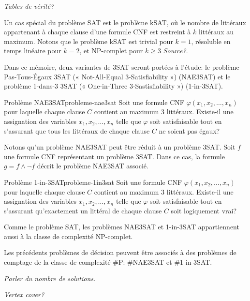 \textcolor{mydarkred}{\textit{Tables de vérité?}}

Un cas spécial du problème SAT est le problème kSAT, où le nombre de littéraux appartenant à chaque clause d'une formule CNF est restreint à $k$ littéraux au maximum. Notons que le problème kSAT est trivial pour $k=1$, résoluble en temps linéaire pour $k=2$, et \textsf{NP}-complet pour $k \geq 3$ \textcolor{mydarkred}{\textit{Source?}}.

Dans ce mémoire, deux variantes de 3SAT seront portées à l'étude: le problème Pas-Tous-Égaux 3SAT (« Not-All-Equal 3-Satisfiability ») (NAE3SAT) et le problème 1-dans-3 3SAT (« One-in-Three 3-Sastisfiability ») (1-in-3SAT).

\begin{maindefinition}{Problème NAE3SAT}{probleme-nae3sat}
    Soit une formule CNF $\varphi(x_{1}, x_{2}, \dots, x_{n})$ pour laquelle chaque clause $C$ contient au maximum 3 littéraux. Existe-il une assignation des variables $x_{1}, x_{2}, \dots, x_{n}$ telle que $\varphi$ soit satisfaisable tout en s'assurant que tous les littéraux de chaque clause $C$ ne soient pas égaux?
\end{maindefinition}

Notons qu'un problème NAE3SAT peut être réduit à un problème 3SAT. Soit $f$ une formule CNF représentant un problème 3SAT. Dans ce cas, la formule $g = f \land \neg f$ décrit le problème NAE3SAT associé.

\begin{maindefinition}{Problème 1-in-3SAT}{probleme-1in3sat}
    Soit une formule CNF $\varphi(x_{1}, x_{2}, \dots, x_{n})$ pour laquelle chaque clause $C$ contient au maximum 3 littéraux. Existe-il une assignation des variables $x_{1}, x_{2}, \dots, x_{n}$ telle que $\varphi$ soit satisfaisable tout en s'assurant qu'exactement un littéral de chaque clause $C$ soit logiquement vrai?
\end{maindefinition}

Comme le problème SAT, les problèmes NAE3SAT et 1-in-3SAT appartiennent aussi à la classe de complexité \textsf{NP}-complet.

Les précédents problèmes de décision peuvent être associés à des problèmes de comptage de la classe de complexité \textsf{\#P}: \#NAE3SAT et \#1-in-3SAT. 

\textcolor{mydarkred}{\textit{Parler du nombre de solutions.}}

\textcolor{mydarkred}{\textit{Vertex cover?}}



